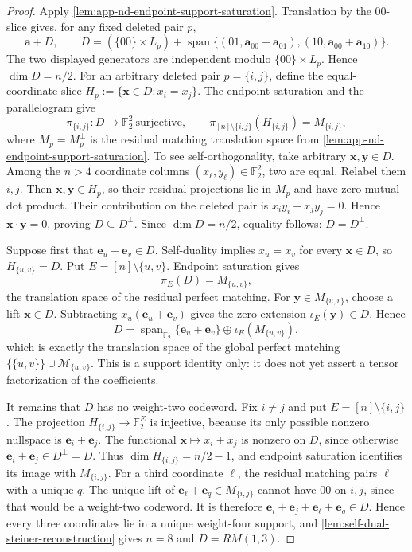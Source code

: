 \documentclass[11pt,letterpaper,onecolumn]{article}
\theoremstyle{plain}
\theoremstyle{definition}
\theoremstyle{remark}
\newcommand{\Ftwo}{\mathbb F_2}
\newcommand{\Span}{\operatorname{span}}
\begin{document}
\begin{proof}
Apply \cref{lem:app-nd-endpoint-support-saturation}.  Translation by the
\(00\)-slice gives, for any fixed deleted pair \(p\),
\begin{equation*}
  {\mathbf{a}}+D,\qquad
  D=(\{00\}\times L_p)
    +\Span\{(01,{\mathbf{a}}_{00}+{\mathbf{a}}_{01}),
             (10,{\mathbf{a}}_{00}+{\mathbf{a}}_{10})\}.
\end{equation*}
The two displayed generators are independent modulo
\(\{00\}\times L_p\). Hence \(\dim D=n/2\).  For an arbitrary deleted
pair \(p=\{i,j\}\), define the equal-coordinate slice
\(H_p:=\{{\mathbf{x}}\in D:x_i=x_j\}\).  The endpoint saturation and
the parallelogram give
\[
  \pi_{\{i,j\}}:D\longrightarrow\Ftwo^2\ \text{surjective},\qquad
  \pi_{[n]\setminus\{i,j\}}(H_{\{i,j\}})=M_{\{i,j\}},
\]
where \(M_p=M_p^\perp\) is the residual matching translation space from
\cref{lem:app-nd-endpoint-support-saturation}.  To see
self-orthogonality, take arbitrary \({\mathbf{x}},{\mathbf{y}}\in D\).  Among the \(n>4\)
coordinate columns
\((x_\ell,y_\ell)\in\Ftwo^2\), two are equal. Relabel them \(i,j\).  Then
\({\mathbf{x}},{\mathbf{y}}\in H_p\), so their residual projections lie in \(M_p\) and have zero
mutual dot product.  Their contribution on the deleted pair is
\(x_i y_i+x_j y_j=0\).  Hence \({\mathbf{x}}\cdot {\mathbf{y}}=0\), proving
\(D\subseteq D^\perp\).  Since \(\dim D=n/2\), equality follows:
\(D=D^\perp\).

Suppose first that \({\mathbf{e}}_u+{\mathbf{e}}_v\in D\).  Self-duality implies
\(x_u=x_v\) for every \({\mathbf{x}}\in D\), so \(H_{\{u,v\}}=D\).  Put
\(E=[n]\setminus\{u,v\}\).  Endpoint saturation gives
\[
 \pi_E(D)=M_{\{u,v\}},
\]
the translation space of the residual perfect matching.  For
\({\mathbf{y}}\in M_{\{u,v\}}\), choose a lift \({\mathbf{x}}\in D\).  Subtracting
\(x_u({\mathbf{e}}_u+{\mathbf{e}}_v)\) gives the zero extension \(\iota_E({\mathbf{y}})\in D\).  Hence
\[
 D=\Span_{\Ftwo}\{{\mathbf{e}}_u+{\mathbf{e}}_v\}
   \oplus\iota_E(M_{\{u,v\}}),
\]
which is exactly the translation space of the global perfect matching
\(\{\{u,v\}\}\cup\mathcal M_{\{u,v\}}\).  This is a support identity
only: it does not yet assert a tensor factorization of the coefficients.

It remains that \(D\) has no weight-two codeword.  Fix \(i\ne j\) and put
\(E=[n]\setminus\{i,j\}\).  The projection
\(H_{\{i,j\}}\to\Ftwo^E\) is injective, because its only possible nonzero nullspace
is \({\mathbf{e}}_i+{\mathbf{e}}_j\).  The functional \({\mathbf{x}}\mapsto x_i+x_j\) is nonzero on \(D\),
since otherwise \({\mathbf{e}}_i+{\mathbf{e}}_j\in D^\perp=D\).  Thus
\(\dim H_{\{i,j\}}=n/2-1\), and endpoint saturation identifies its image with
\(M_{\{i,j\}}\).  For a third coordinate \(\ell\), the residual matching
pairs \(\ell\) with a unique \(q\).  The unique lift of
\({\mathbf{e}}_\ell+{\mathbf{e}}_q\in M_{\{i,j\}}\) cannot have \(00\) on \(i,j\), since that would
be a weight-two codeword.  It is therefore
\({\mathbf{e}}_i+{\mathbf{e}}_j+{\mathbf{e}}_\ell+{\mathbf{e}}_q\in D\).  Hence every three coordinates lie in a unique
weight-four support, and
\cref{lem:self-dual-steiner-reconstruction} gives \(n=8\) and
\(D=RM(1,3)\).


\end{proof}
\end{document}
